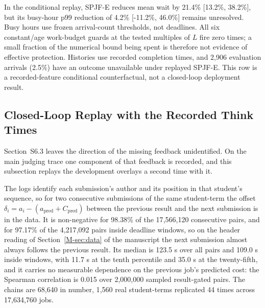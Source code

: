 \documentclass[mathematics,supfile,submit,moreauthors]{Definitions/mdpi}
\newcommand{\devnum}[1]{#1}
\begin{document}
In the conditional replay, SPJF-E reduces mean wait by
\devnum{21.4\% [13.2\%, 38.2\%]}, but its busy-hour p99 reduction of
\devnum{4.2\% [-11.2\%, 46.0\%]} remains unresolved. Busy hours use frozen
arrival-count thresholds, not deadlines. All six constant/age work-budget guards
at the tested multiples of $L$ fire zero times; a small fraction of the numerical
bound being spent is therefore not evidence of effective protection. Histories
use recorded completion times, and \devnum{2{,}906} evaluation arrivals
(\devnum{2.5\%}) have an outcome unavailable under replayed SPJF-E. This row is a
recorded-feature conditional counterfactual, not a closed-loop deployment result.


\subsection{Closed-Loop Replay with the Recorded Think Times}
\label{sec:supp_closed_loop}

Section~S6.3 leaves the direction of the missing feedback unidentified. On the main
judging trace one component of that feedback is recorded, and this subsection replays the
development overlays a second time with it.

The logs identify each submission's author and its position in that student's sequence,
so for two consecutive submissions of the same student-term the offset
$\delta_i = a_i - (a_{\mathrm{pred}} + C_{\mathrm{pred}})$ between the previous result and
the next submission is in the data. It is non-negative for \devnum{98.38\%} of the
\devnum{17{,}566{,}120} consecutive pairs, and for \devnum{97.17\%} of the
\devnum{4{,}217{,}092} pairs inside deadline windows, so on the header reading of
Section~\ref*{M-sec:data} of the manuscript the next submission almost always follows the previous
result. Its median is \devnum{123.5} s over all pairs and \devnum{109.0} s inside
windows, with \devnum{11.7} s at the tenth percentile and \devnum{35.0} s at the
twenty-fifth, and it carries no measurable dependence on the previous job's predicted
cost: the Spearman correlation is \devnum{0.015} over \devnum{2{,}000{,}000} sampled
result-gated pairs. The chains are \devnum{68{,}640} in number, \devnum{1{,}560} real
student-terms replicated \devnum{44} times across \devnum{17{,}634{,}760} jobs.
\end{document}
